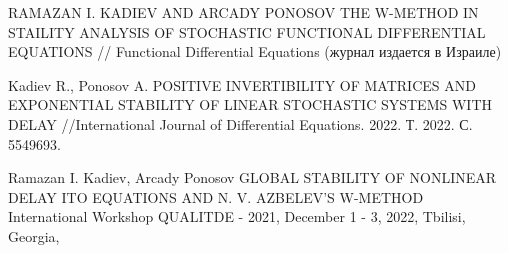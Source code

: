 \begin{thebibliography}{111}
 RAMAZAN I. KADIEV AND ARCADY PONOSOV THE W-METHOD IN STAILITY
ANALYSIS OF STOCHASTIC FUNCTIONAL DIFFERENTIAL EQUATIONS //
Functional Differential Equations (журнал издается в Израиле)

 Kadiev R., Ponosov A. POSITIVE INVERTIBILITY OF MATRICES AND
EXPONENTIAL STABILITY OF LINEAR STOCHASTIC SYSTEMS WITH DELAY
//International Journal of Differential Equations. 2022. Т. 2022. С.
5549693.

 Ramazan I. Kadiev, Arcady Ponosov GLOBAL STABILITY OF
NONLINEAR DELAY  ITO EQUATIONS AND N. V. AZBELEV'S W-METHOD \\
International Workshop QUALITDE - 2021, December 1 - 3, 2022,
Tbilisi, Georgia,

\end{thebibliography} 